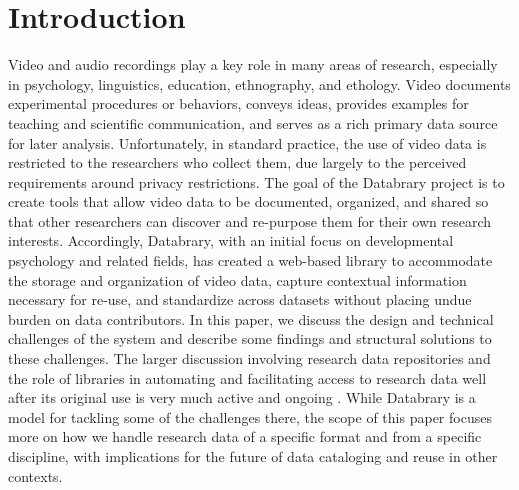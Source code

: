 \documentclass{sig-alternate}
\begin{document}


\section{Introduction}


Video and audio recordings play a key role in many areas of research, especially in psychology, linguistics, education, ethnography, and ethology.
Video documents experimental procedures or behaviors, conveys ideas, provides examples for teaching and scientific communication, and serves as a rich primary data source for later analysis.
Unfortunately, in standard practice, the use of video data is restricted to the researchers who collect them, due largely to the perceived requirements around privacy restrictions.
The goal of the Databrary project is to create tools that allow video data to be documented, organized, and shared so that other researchers can discover and re-purpose them for their own research interests.
Accordingly, Databrary, with an initial focus on developmental psychology and related fields, has created a web-based library to accommodate the storage and organization of video data, capture contextual information necessary for re-use, and standardize across datasets without placing undue burden on data contributors.
In this paper, we discuss the design and technical challenges of the system and describe some findings and structural solutions to these challenges.
The larger discussion involving research data repositories and the role of libraries in automating and facilitating access to research data well after its original use is very much active and ongoing \cite{Castelli_etal_2013, Nielson_Hjørland_2014, Macmillan_2014}.
While Databrary is a model for tackling some of the challenges there, the scope of this paper focuses more on how we handle research data of a specific format and from a specific discipline, with implications for the future of data cataloging and reuse in other contexts.
\end{document}
